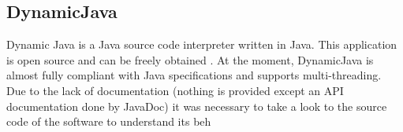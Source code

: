 \subsection{DynamicJava}
\label{sec:DynamicJava}

Dynamic Java is a Java source code interpreter written in Java. This application is open source and can be freely obtained . At the moment, DynamicJava is almost fully compliant with Java specifications and supports multi-threading. Due to the lack of documentation (nothing is provided except an API documentation done by JavaDoc) it was necessary to take a look to the source code of the software to understand its beh